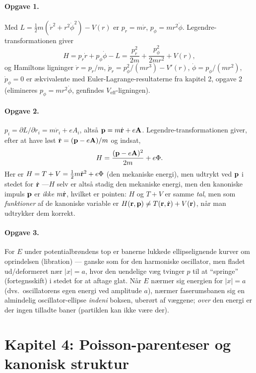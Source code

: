 \paragraph{Opgave 1.} Med $L=\frac12m(\dot r^2+r^2\dot\phi^2)-V(r)$ er
$p_r=m\dot r$, $p_\phi=mr^2\dot\phi$. Legendre-transformationen giver
\begin{equation*}
  H = p_r\dot r+p_\phi\dot\phi-L = \frac{p_r^2}{2m}+\frac{p_\phi^2}{2mr^2}+V(r),
\end{equation*}
og Hamiltons ligninger $\dot r=p_r/m$, $\dot p_r=p_\phi^2/(mr^3)-V'(r)$,
$\dot\phi=p_\phi/(mr^2)$, $\dot p_\phi=0$ er ækvivalente med
Euler-Lagrange-resultaterne fra kapitel 2, opgave 2 (elimineres
$p_\phi=mr^2\dot\phi$, genfindes $V_\text{eff}$-ligningen).

\paragraph{Opgave 2.} $p_i=\partial L/\partial\dot r_i=m\dot r_i+eA_i$,
altså $\vb{p}=m\dot{\vb{r}}+e\vb{A}$. Legendre-transformationen giver,
efter at have løst $\dot{\vb{r}}=(\vb{p}-e\vb{A})/m$ og indsat,
\begin{equation*}
  H = \frac{(\vb{p}-e\vb{A})^2}{2m} + e\Phi.
\end{equation*}
Her er $H=T+V=\frac12m\dot{\vb{r}}^2+e\Phi$ (den mekaniske energi),
men udtrykt ved $\vb{p}$ i stedet for $\dot{\vb{r}}$ —$H$ selv er
altså stadig den mekaniske energi, men den kanoniske impuls $\vb{p}$
er \emph{ikke} $m\dot{\vb{r}}$, hvilket er pointen: $H$ og $T+V$ er
samme \emph{tal}, men som \emph{funktioner} af de kanoniske variable
er $H(\vb{r},\vb{p})\neq T(\vb{r},\dot{\vb{r}})+V(\vb{r})$, når man
udtrykker dem korrekt.

\paragraph{Opgave 3.} For $E$ under potentialbrøndens top er banerne
lukkede ellipselignende kurver om oprindelsen (libration) — ganske
som for den harmoniske oscillator, men fladet ud/deformeret nær
$|x|=a$, hvor den uendelige væg tvinger $p$ til at ``springe''
(fortegnsskift) i stedet for at aftage glat. Når $E$ nærmer sig
energien for $|x|=a$ (dvs.\ oscillatorens egen energi ved amplitude
$a$), nærmer faserumsbanen sig en almindelig oscillator-ellipse
\emph{indeni} boksen, uberørt af væggene; \emph{over} den energi er
der ingen tilladte baner (partiklen kan ikke være der).

\section*{Kapitel 4: Poisson-parenteser og kanonisk struktur}

